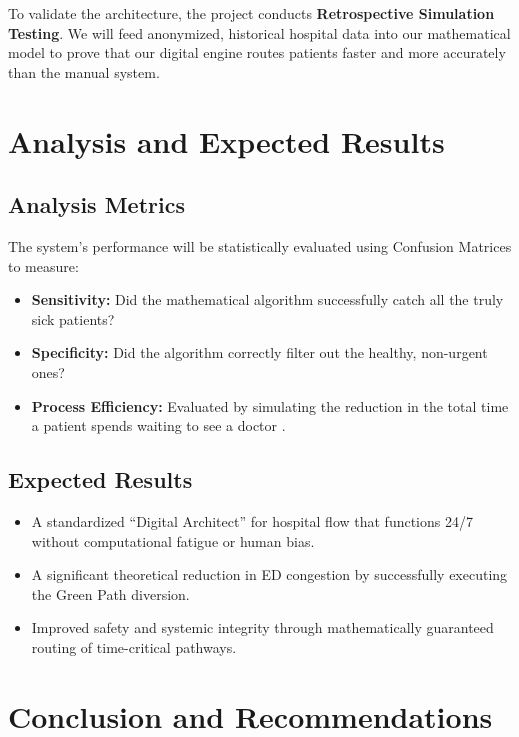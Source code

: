 \documentclass[12pt, a4paper]{article}
\begin{document}
	To validate the architecture, the project conducts \textbf{Retrospective Simulation Testing}. We will feed anonymized, historical hospital data into our mathematical model to prove that our digital engine routes patients faster and more accurately than the manual system.
	
	\section{Analysis and Expected Results}
	\subsection*{Analysis Metrics}
	The system's performance will be statistically evaluated using Confusion Matrices to measure:
	\begin{itemize}
		\item \textbf{Sensitivity:} Did the mathematical algorithm successfully catch all the truly sick patients?
		\item \textbf{Specificity:} Did the algorithm correctly filter out the healthy, non-urgent ones?
		\item \textbf{Process Efficiency:} Evaluated by simulating the reduction in the total time a patient spends waiting to see a doctor \cite{mitchell2023}.
	\end{itemize}
	
	\subsection*{Expected Results}
	\begin{itemize}
		\item A standardized ``Digital Architect'' for hospital flow that functions 24/7 without computational fatigue or human bias.
		\item A significant theoretical reduction in ED congestion by successfully executing the Green Path diversion.
		\item Improved safety and systemic integrity through mathematically guaranteed routing of time-critical pathways.
	\end{itemize}
	
	\section{Conclusion and Recommendations}
\end{document}
